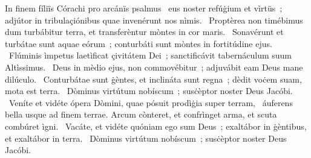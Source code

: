 { In finem fíliïs Córachi pro arcánïs psalmus}
{%
~eus noster refúġium et vìrtüs~; adjútor in tribulaçiónibus quae invenérunt nos nìmis. 
~Proptèrea non timébimus dum turbábitur terra, et transferèntur mòntes in cor maris. 
~Sonavérunt et turbátae sunt aquae eórum~; conturbáti sunt mòntes in fortitúdine ejus. 
~Flúminis ìmpetus laetìficat çivitátem Dei~; sanctificávit tabernáculum suum Altìssimus. 
~Deus in mèdio ejus, non commovébitur~; adjuvábit eam Deus mane dilúculo. 
~Conturbátae sunt ġèntes, et inclináta sunt regna~; dèdit voċem suam, mota est terra. 
~Dòminus virtútum nobíscum~; susċèptor noster Deus Jacóbi. 
~Veníte et vidéte ópera Dòmini, quae pósuit prodìġia super terram, 
~áuferens bella usque ad finem terrae. Arcum cònteret, et confrìnget arma, et scuta combúret ìgni. 
~Vacáte, et vidéte quóniam ego sum Deus~; exaltábor in ġèntibus, et exaltábor in terra. 
~Dòminus virtútum nobíscum~; susċèptor noster Deus Jacóbi. 
}
